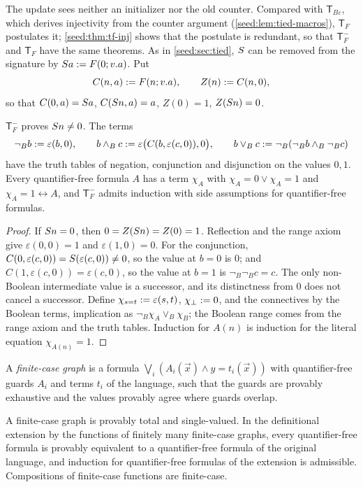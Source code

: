 The update sees neither an initializer nor the old counter. Compared with
$\mathsf{T}_{B\varepsilon}$, which derives injectivity from the counter
argument (\cref{seed:lem:tied-macros}), $\mathsf{T}_F$ postulates it;
\cref{seed:thm:tf-inj} shows that the postulate is redundant, so that
$\mathsf{T}_F^{-}$ and $\mathsf{T}_F$ have the same theorems. As in
\cref{seed:sec:tied}, $S$ can be removed from the signature by
$S a\mathrel{:=} F(0;v.a)$. Put
\[
 C(n,a)\mathrel{:=} F(n;v.a),\qquad Z(n)\mathrel{:=} C(n,0),
\]
so that $C(0,a)=S a$, $C(S n,a)=a$, $Z(0)=1$, $Z(S n)=0$.

\begin{lemma}\label{seed:lem:tf-basic}
$\mathsf{T}_F^{-}$ proves $S n\neq0$. The terms
\[
 \neg_Bb\mathrel{:=}\varepsilon(b,0),\qquad
 b\land_Bc\mathrel{:=}\varepsilon\bigl(C(b,\varepsilon(c,0)),0\bigr),\qquad
 b\lor_Bc\mathrel{:=}\neg_B(\neg_Bb\land_B\neg_Bc)
\]
have the truth tables of negation, conjunction and disjunction on the values
$0,1$. Every quantifier-free formula $A$ has a term $\chi_A$ with
$\chi_A=0\lor\chi_A=1$ and $\chi_A=1\leftrightarrow A$, and
$\mathsf{T}_F^{-}$ admits induction with side assumptions for
quantifier-free formulas.
\end{lemma}

\begin{proof}
If $S n=0$, then $0=Z(S n)=Z(0)=1$. Reflection and the range axiom
give $\varepsilon(0,0)=1$ and $\varepsilon(1,0)=0$. For the conjunction,
$C(0,\varepsilon(c,0))=S(\varepsilon(c,0))\neq0$, so the value at $b=0$
is $0$; and $C(1,\varepsilon(c,0))=\varepsilon(c,0)$, so the value at $b=1$
is $\neg_B\neg_Bc=c$. The only non-Boolean intermediate value is a
successor, and its distinctness from $0$ does not cancel a successor. Define
$\chi_{s=t}\mathrel{:=}\varepsilon(s,t)$, $\chi_\bot\mathrel{:=}0$, and the connectives
by the Boolean terms, implication as $\neg_B\chi_A\lor_B\chi_B$; the Boolean
range comes from the range axiom and the truth tables. Induction for $A(n)$
is induction for the literal equation $\chi_{A(n)}=1$.
\end{proof}

\begin{definition}\label{seed:def:finite-case}
A \emph{finite-case graph} is a formula
$\bigvee_i(A_i(\vec x)\land y=t_i(\vec x))$ with quantifier-free guards $A_i$
and terms $t_i$ of the language, such that the guards are provably
exhaustive and the values provably agree where guards overlap.
\end{definition}

\begin{lemma}\label{seed:lem:tf-cases}
A finite-case graph is provably total and single-valued. In the definitional
extension by the functions of finitely many finite-case graphs, every
quantifier-free formula is provably equivalent to a quantifier-free formula
of the original language, and induction for quantifier-free formulas of the
extension is admissible. Compositions of finite-case functions are
finite-case.
\end{lemma}

